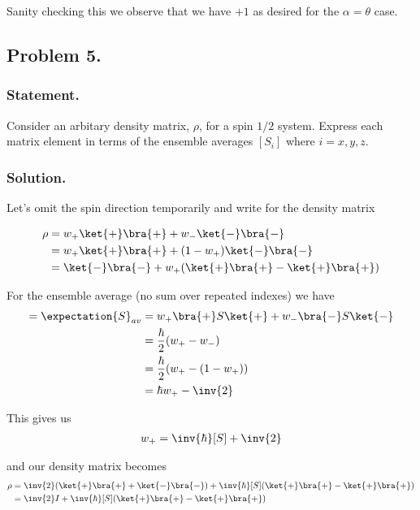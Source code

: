 Sanity checking this we observe that we have $+1$ as desired for the $\alpha = \theta$ case.

\subsection{Problem 5.}
\subsubsection{Statement.}

Consider an arbitary density matrix, $\rho$, for a spin $1/2$ system.  Express each matrix element in terms of the ensemble averages $[S_i]$ where $i = x,y,z$.

\subsubsection{Solution.}

Let's omit the spin direction temporarily and write for the density matrix

\begin{align*}
\rho 
&= 
w_{+} \ket{+}\bra{+}
+
w_{-} \ket{-}\bra{-} \\
&=
w_{+} \ket{+}\bra{+}
+
(1 - w_{+})\ket{-}\bra{-} \\
&=
\ket{-}\bra{-} 
+
w_{+} (\ket{+}\bra{+} -\ket{+}\bra{+})
\end{align*}

For the ensemble average (no sum over repeated indexes) we have
\begin{align*}
[S] = \expectation{S}_{av} &= 
w_{+} \bra{+} S \ket{+} 
+
w_{-} \bra{-} S \ket{-} \\
&= \frac{\hbar}{2}( w_{+} -w_{-} ) \\
&= \frac{\hbar}{2}( w_{+} -(1 - w_{+}) ) \\
&= 
\hbar w_{+} - \inv{2}
\end{align*}

This gives us
\begin{align*}
w_{+} = \inv{\hbar} [S] + \inv{2}
\end{align*}

and our density matrix becomes
\begin{align*}
\rho 
&=
\inv{2} ( \ket{+}\bra{+} +\ket{-}\bra{-} )
+
\inv{\hbar} [S] (\ket{+}\bra{+} -\ket{+}\bra{+}) \\
&=
\inv{2} I
+
\inv{\hbar} [S] (\ket{+}\bra{+} -\ket{+}\bra{+}) \\
\end{align*}


